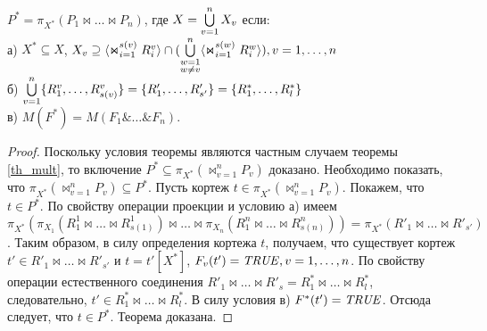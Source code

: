 \author{Мосин Сергей, Зыкин Сергей}
\begin{theorem}
$P^{\ast} = \pi_{X^{\ast}} (P_1 \Join \dots \Join 
P_n)$, где $X = \bigcup\limits_{v=1}^{n} X_{v}$ если:
\\а) $X^{\ast} \subseteq X$, $X_v \supseteq \<\Join_{i=1}^{s(v)} R^v_i> \cap (\bigcup\limits_{\substack{w=1\\ w \neq v}}^{n} \<\Join_{i=1}^{s(w)} R^w_i> ), v = 1,\dots,n$
\\б)
$ \bigcup\limits_{v=1}^{n} \{R^{v}_{1}, \ldots, R^{v}_{s(v)}\} = \{R'_{1}, \ldots, R'_{s'}\}
= \{R^{\ast}_{1}, \ldots, R^{\ast}_{l}\} $
\\в) $M(F^{\ast}) = M(F_{1} \& \dots \& F_{n})$.
\label{th_mult_eq}
\end{theorem} 
\begin{proof}

Поскольку условия теоремы являются частным случаем теоремы \ref{th_mult}, то
включение $P^{\ast} \subseteq \pi_{X^{\ast}} (\Join_{v=1}^{n} P_{v})$
доказано. Необходимо показать, что
$\pi_{X^{\ast}} (\Join_{v=1}^{n} P_{v}) \subseteq P^{\ast}$. Пусть
кортеж $t \in \pi_{X^{\ast}} (\Join_{v=1}^{n} P_{v})$. Покажем, что
$t \in P^{\ast}$. По свойству операции проекции и условию а) имеем
$\pi_{X^{\ast}}(\pi_{X_1}(R^1_1 \Join \dots \Join R^1_{s(1)}) \Join \dots
\Join \pi_{X_n}(R^n_1 \Join \dots \Join R^n_{s(n)})) = \pi_{X^{\ast}}
(R'_1 \Join \dots \Join R'_{s'})$. Таким образом, в силу определения кортежа
$t$, получаем, что существует кортеж  $t' \in R'_1 \Join \ldots \Join
R'_{s'}$ и $t = t'[X^{\ast}]$, $F_v(t')=\mathit{TRUE}, v = 1,\dots,n$. По свойству
операции естественного соединения $R'_1 \Join \ldots \Join R'_s = R^{\ast}_1
\Join \ldots \Join R^{\ast}_l$, следовательно, $t' \in R^{\ast}_1 \Join
\ldots \Join R^{\ast}_l$. В силу условия в) $F^{\ast} (t')=\mathit{TRUE}$. Отсюда следует, что $t \in P^{\ast}$.
Теорема доказана.
\end{proof} 
